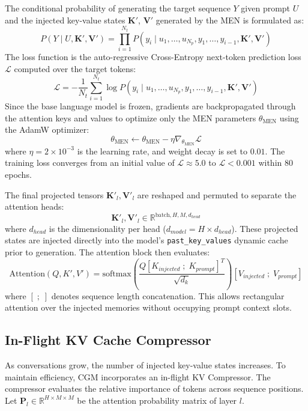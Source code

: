 \documentclass[conference]{IEEEtran}
\begin{document}
The conditional probability of generating the target sequence $Y$ given prompt $U$ and the injected key-value states $\mathbf{K}'$, $\mathbf{V}'$ generated by the MEN is formulated as:
\begin{equation}
P(Y \mid U, \mathbf{K}', \mathbf{V}') = \prod_{i=1}^{N_t} P(y_i \mid u_1, \dots, u_{N_p}, y_1, \dots, y_{i-1}, \mathbf{K}', \mathbf{V}')
\end{equation}
The loss function is the auto-regressive Cross-Entropy next-token prediction loss $\mathcal{L}$ computed over the target tokens:
\begin{equation}
\mathcal{L} = -\frac{1}{N_t} \sum_{i=1}^{N_t} \log P(y_i \mid u_1, \dots, u_{N_p}, y_1, \dots, y_{i-1}, \mathbf{K}', \mathbf{V}')
\end{equation}
Since the base language model is frozen, gradients are backpropagated through the attention keys and values to optimize only the MEN parameters $\theta_{\text{MEN}}$ using the AdamW optimizer:
\begin{equation}
\theta_{\text{MEN}} \leftarrow \theta_{\text{MEN}} - \eta \nabla_{\theta_{\text{MEN}}} \mathcal{L}
\end{equation}
where $\eta = 2 \times 10^{-3}$ is the learning rate, and weight decay is set to $0.01$. The training loss converges from an initial value of $\mathcal{L} \approx 5.0$ to $\mathcal{L} < 0.001$ within 80 epochs.

The final projected tensors $\mathbf{K}'_l, \mathbf{V}'_l$ are reshaped and permuted to separate the attention heads:
\begin{equation}
\mathbf{K}'_l, \mathbf{V}'_l \in \mathbb{R}^{\text{batch}, H, M, d_{head}}
\end{equation}
where $d_{head}$ is the dimensionality per head ($d_{model} = H \times d_{head}$). These projected states are injected directly into the model's \texttt{past\_key\_values} dynamic cache prior to generation. The attention block then evaluates:
\begin{equation}
\text{Attention}(Q, K', V') = \text{softmax}\left(\frac{Q [K_{injected} \;;\; K_{prompt}]^T}{\sqrt{d_k}}\right) [V_{injected} \;;\; V_{prompt}]
\end{equation}
where $[ \;;\; ]$ denotes sequence length concatenation. This allows rectangular attention over the injected memories without occupying prompt context slots.

\subsection{In-Flight KV Cache Compressor}
As conversations grow, the number of injected key-value states increases. To maintain efficiency, CGM incorporates an in-flight KV Compressor. The compressor evaluates the relative importance of tokens across sequence positions. Let $\mathbf{P}_l \in \mathbb{R}^{H \times M \times M}$ be the attention probability matrix of layer $l$. 
\end{document}
